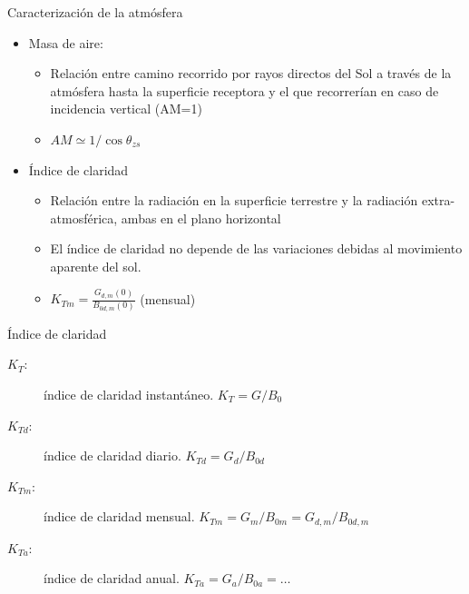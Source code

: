 \documentclass[xcolor={usenames,svgnames,dvipsnames}]{beamer}
\begin{document}
\begin{frame}[label={sec:org1b88f72}]{Caracterización de la atmósfera}
\begin{itemize}
\item \alert{Masa de aire}:

\begin{itemize}
\item Relación entre camino recorrido por rayos directos del Sol a
través de la atmósfera hasta la superficie receptora y el que recorrerían en caso de incidencia vertical (AM=1)

\item \(AM \simeq 1/\cos\theta_{zs}\)
\end{itemize}

\item \alert{Índice de claridad}

\begin{itemize}
\item Relación entre la radiación en la superficie terrestre y la
radiación extra-atmosférica, ambas en el plano horizontal

\item El índice de claridad \alert{no depende de las variaciones debidas al
movimiento aparente del sol}.

\item \(K_{Tm}=\frac{G_{d,m}(0)}{B_{0d,m}(0)}\) (mensual)
\end{itemize}
\end{itemize}
\end{frame}

\begin{frame}[label={sec:org8345c68}]{Índice de claridad}
\begin{description}
\item[{\(K_{T}\):}] índice de claridad instantáneo. \(K_{T}=G/B_{0}\)

\item[{\(K_{Td}\):}] índice de claridad diario. \(K_{Td}=G_{d}/B_{0d}\)

\item[{\(K_{Tm}\):}] índice de claridad mensual. \(K_{Tm}=G_{m}/B_{0m}=G_{d,m}/B_{0d,m}\)

\item[{\(K_{Ta}\):}] índice de claridad anual. \(K_{Ta} = G_{a}/B_{0a} = \dots\)
\end{description}
\end{frame}
\end{document}

